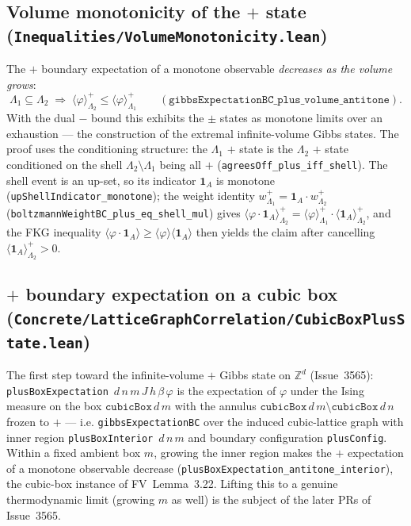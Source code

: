 \documentclass[a4paper,11pt]{article}
\begin{document}
\subsection{Volume monotonicity of the $+$ state
(\texttt{Inequalities/VolumeMonotonicity.lean})}

The $+$ boundary expectation of a monotone observable \emph{decreases as the
volume grows}:
\[
  \Lambda_1 \subseteq \Lambda_2 \;\Longrightarrow\;
  \langle \varphi \rangle^{+}_{\Lambda_2} \le \langle \varphi
  \rangle^{+}_{\Lambda_1}
  \qquad (\texttt{gibbsExpectationBC\_plus\_volume\_antitone}).
\]
With the dual $-$ bound this exhibits the $\pm$ states as monotone limits over an
exhaustion --- the construction of the extremal infinite-volume Gibbs states. The
proof uses the conditioning structure: the $\Lambda_1$ $+$ state is the
$\Lambda_2$ $+$ state conditioned on the shell $\Lambda_2 \setminus \Lambda_1$
being all $+$ (\texttt{agreesOff\_plus\_iff\_shell}). The shell event is an
up-set, so its indicator $\mathbf{1}_A$ is monotone
(\texttt{upShellIndicator\_monotone}); the weight identity
$w^{+}_{\Lambda_1} = \mathbf{1}_A \cdot w^{+}_{\Lambda_2}$
(\texttt{boltzmannWeightBC\_plus\_eq\_shell\_mul}) gives
$\langle \varphi \cdot \mathbf{1}_A \rangle^{+}_{\Lambda_2}
= \langle \varphi \rangle^{+}_{\Lambda_1} \cdot
\langle \mathbf{1}_A \rangle^{+}_{\Lambda_2}$, and the FKG inequality
$\langle \varphi \cdot \mathbf{1}_A \rangle \ge \langle \varphi \rangle
\langle \mathbf{1}_A \rangle$ then yields the claim after cancelling
$\langle \mathbf{1}_A \rangle^{+}_{\Lambda_2} > 0$.

\subsection{$+$ boundary expectation on a cubic box
(\texttt{Concrete/LatticeGraphCorrelation/CubicBoxPlusState.lean})}

The first step toward the infinite-volume $+$ Gibbs state on $\mathbb{Z}^d$
(Issue~3565): \texttt{plusBoxExpectation}~$d\,n\,m\,J\,h\,\beta\,\varphi$ is the
expectation of $\varphi$ under the Ising measure on the box
$\texttt{cubicBox}\,d\,m$ with the annulus
$\texttt{cubicBox}\,d\,m \setminus \texttt{cubicBox}\,d\,n$ frozen to $+$ --- i.e.
\texttt{gibbsExpectationBC} over the induced cubic-lattice graph with inner region
\texttt{plusBoxInterior}~$d\,n\,m$ and boundary configuration \texttt{plusConfig}.
Within a fixed ambient box $m$, growing the inner region makes the $+$ expectation
of a monotone observable decrease
(\texttt{plusBoxExpectation\_antitone\_interior}), the cubic-box instance of
FV~Lemma~3.22. Lifting this to a genuine thermodynamic limit (growing $m$ as well)
is the subject of the later PRs of Issue~3565.
\end{document}
